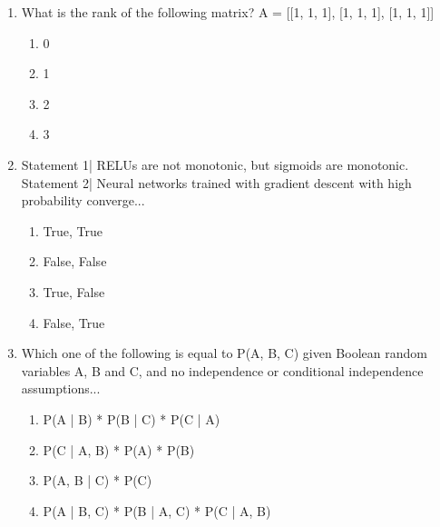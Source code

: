 \documentclass[12pt]{article}
\begin{document}
\begin{enumerate}[label=\arabic*.]
\begin{enumerate}[label=(\alph*)]
    \item P(A|B) decreases
    \item P(B|A) decreases
    \item P(B) decreases
    \item All of above
\end{enumerate}
\item What is the rank of the following matrix? A = [[1, 1, 1], [1, 1, 1], [1, 1, 1]]
\begin{enumerate}[label=(\alph*)]
    \item 0
    \item 1
    \item 2
    \item 3
\end{enumerate}
\item Statement 1| RELUs are not monotonic, but sigmoids are monotonic. Statement 2| Neural networks trained with gradient descent with high probability converge...
\begin{enumerate}[label=(\alph*)]
    \item True, True
    \item False, False
    \item True, False
    \item False, True
\end{enumerate}
\item Which one of the following is equal to P(A, B, C) given Boolean random variables A, B and C, and no independence or conditional independence assumptions...
\begin{enumerate}[label=(\alph*)]
    \item P(A | B) * P(B | C) * P(C | A)
    \item P(C | A, B) * P(A) * P(B)
    \item P(A, B | C) * P(C)
    \item P(A | B, C) * P(B | A, C) * P(C | A, B)
\end{enumerate}
\end{enumerate}
\end{document}
